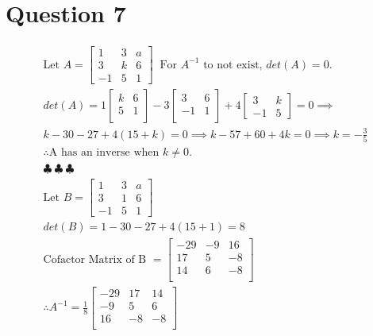 \documentclass[12pt, a4paper]{article}
\begin{document}
\section{Question 7}
\begin{gather*}
  \text{Let } A = 
  \left[ \begin{array}{ccc}
    1 & 3 & a \\
    3 & k & 6 \\
    -1 & 5 & 1
  \end{array} \right] \; \;
  \text{For $A^{-1}$ to not exist, } det(A) = 0.\\[5pt]
  det(A) = 1
  \left[ \begin{array}{cc}
    k & 6 \\
    5 & 1 \\
  \end{array} \right] 
  -3
  \left[ \begin{array}{cc}
    3 & 6 \\
    -1 & 1 \\
  \end{array} \right]
  +4
  \left[ \begin{array}{cc}
    3 & k\\ 
    -1 & 5
  \end{array} \right] = 0 \implies \\[5pt]
  k - 30 - 27 + 4(15 + k) = 0 \implies
  k - 57 + 60 + 4k = 0 \implies
  k = -\frac{3}{5} \\
  \therefore \text{A has an inverse when } k \neq 0. \\[5pt]
  \clubsuit~\clubsuit~\clubsuit \\[5pt]
  \text{Let } B = 
  \left[ \begin{array}{ccc}
    1 & 3 & a \\
    3 & 1 & 6 \\
    -1 & 5 & 1
  \end{array} \right] \\[5pt]
  det(B) = 1 - 30 - 27 + 4(15 + 1) = 8 \\[5pt]
  \text{Cofactor Matrix of B } = 
  \left[ \begin{array}{ccc}
    -29 & -9 & 16 \\
    17 & 5 & -8 \\
    14 & 6 & -8 \\
  \end{array} \right] \\[5pt]
  \therefore A^{-1} = \frac{1}{8}
  \left[ \begin{array}{ccc}
    -29 & 17 & 14 \\
    -9 & 5 & 6 \\
    16 & -8 & -8 \\
  \end{array} \right] \\[5pt]
\end{gather*}
\end{document}
